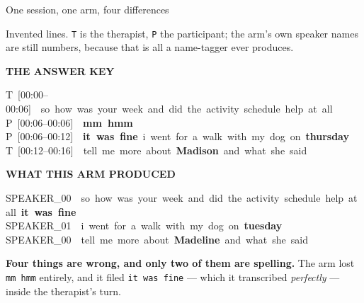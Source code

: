 \documentclass[aspectratio=169]{beamer}
\newcommand{\keybox}[1]{%
  \par\vspace{4pt}\begingroup\centering
  \colorbox{warmbg}{\parbox{0.93\textwidth}{\centering #1}}%
  \par\endgroup\vspace{2pt}}
\newcommand{\keyblock}[1]{%
  \par\vspace{2pt}\begingroup\centering
  {\footnotesize\textcolor{good}{\textbf{THE ANSWER KEY}}}\par\vspace{1pt}
  \colorbox{band}{\parbox{0.92\textwidth}{\ttfamily\footnotesize #1}}%
  \par\endgroup\vspace{3pt}}
\newcommand{\armblock}[1]{%
  \par\vspace{2pt}\begingroup\centering
  {\footnotesize\textcolor{soft}{\textbf{WHAT THIS ARM PRODUCED}}}\par\vspace{1pt}
  \colorbox{coolbg}{\parbox{0.92\textwidth}{\ttfamily\footnotesize #1}}%
  \par\endgroup\vspace{3pt}}
\begin{document}
\begin{frame}{One session, one arm, four differences}

Invented lines. \texttt{T} is the therapist, \texttt{P} the participant; the arm's own
speaker names are still numbers, because that is all a name-tagger ever produces.

\keyblock{T~[00:00--00:06]~~so~how~was~your~week~and~did~the~activity~schedule~help~at~all\\
P~[00:06--00:06]~~\textbf{mm~hmm}\\
P~[00:06--00:12]~~\textbf{it~was~fine}~i~went~for~a~walk~with~my~dog~on~\textbf{thursday}\\
T~[00:12--00:16]~~tell~me~more~about~\textbf{Madison}~and~what~she~said}

\armblock{SPEAKER\_00~~so~how~was~your~week~and~did~the~activity~schedule~help~at~all~\textbf{it~was~fine}\\
SPEAKER\_01~~i~went~for~a~walk~with~my~dog~on~\textbf{tuesday}\\
SPEAKER\_00~~tell~me~more~about~\textbf{Madeline}~and~what~she~said}

\keybox{\textbf{Four things are wrong, and only two of them are spelling.} The arm lost
\texttt{mm~hmm} entirely, and it filed \texttt{it~was~fine} --- which it transcribed
\emph{perfectly} --- inside the therapist's turn.}

\end{frame}
\end{document}
